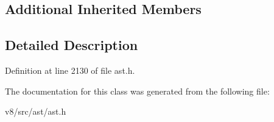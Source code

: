 \subsection*{Additional Inherited Members}


\subsection{Detailed Description}


Definition at line 2130 of file ast.\+h.



The documentation for this class was generated from the following file\+:\begin{DoxyCompactItemize}
\item 
v8/src/ast/ast.\+h\end{DoxyCompactItemize}
